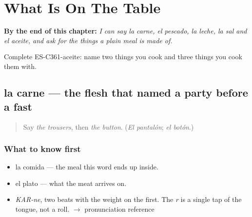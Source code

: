 
\chapter{What Is On The Table}
\label{ch:la-carne-y-la-leche}

\begin{chapteropening}
\textbf{By the end of this chapter:} \emph{I can say la carne, el pescado, la leche, la sal and el aceite, and ask for the things a plain meal is made of.}

Complete ES-C361-aceite: name two things you cook and three things you cook them with.
\end{chapteropening}

\section[la carne]{la carne — the flesh that named a party before a fast}

\label{lesson:ES-C361-carne}



\begin{quote}
Say \emph{the trousers}, then \emph{the button}. (\emph{El pantalón}; \emph{el botón}.)
\end{quote}

\subsection*{What to know first}
\begin{itemize}
\raggedright
  \item la comida — the meal this word ends up inside.
  \item el plato — what the meat arrives on.
\end{itemize}

\begin{sounds}
\begin{itemize}
\raggedright
  \item \emph{KAR-ne}, two beats with the weight on the first. The \emph{r} is a single tap of the tongue, not a roll. $\to$ pronunciation reference
\end{itemize}
\end{sounds}

